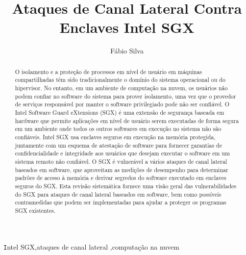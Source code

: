 \documentclass[review]{elsarticle}
\begin{document}
\begin{frontmatter}

\title{Ataques de Canal Lateral Contra Enclaves Intel SGX}

\author{Fábio Silva}
\address{Laboratório de Sistemas Distribuídos\\Universidade Federal de Campina Grande}




\begin{abstract}
O isolamento e a proteção de processos em nível de usuário em máquinas compartilhadas têm sido tradicionalmente o domínio do sistema operacional ou do hipervisor. No entanto, em um ambiente de computação na nuvem, os usuários não podem confiar no software do sistema para prover isolamento, uma vez que o provedor de serviços responsável por manter o software privilegiado pode não ser confiável. O Intel Software Guard eXtensions (SGX) é uma extensão de segurança baseada em hardware que permite aplicações em nível de usuário serem executadas de forma segura em um ambiente onde todos os outros softwares em execução no sistema não são confiáveis. Intel SGX usa enclaves seguros em execução na memória protegida, juntamente com um esquema de atestação de software para fornecer garantias de confidencialidade e integridade aos usuários que desejam executar o software em um sistema remoto não confiável. O SGX é vulnerável a vários ataques de canal lateral baseados em software, que aproveitam as medições de desempenho para determinar padrões de acesso à memória e derivar segredos do software executado em enclaves seguros do SGX. Esta revisão sistemática fornece uma visão geral das vulnerabilidades do SGX para ataques de canal lateral baseados em software, bem como possíveis contramedidas que podem ser implementadas para ajudar a proteger os programas SGX existentes.
\end{abstract}

\begin{keyword}
\texttt Intel SGX\sep ataques de canal lateral \sep computação na nuvem
\end{keyword}

\end{frontmatter}
\end{document}
